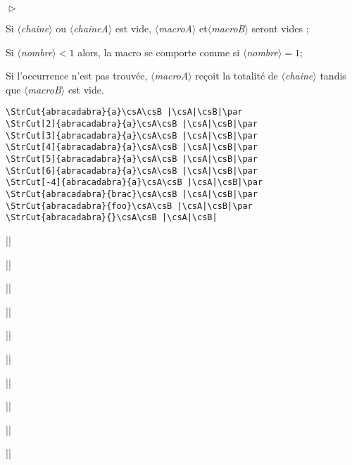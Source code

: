 \documentclass[a4paper,10pt]{article}
\newcommand\argu[1]{$\langle$\textit{#1}$\rangle$}
\newenvironment{Conditions}[1][1cm]%
{\begin{list}%
	{$\vartriangleright$}%
	{\setlength{\leftmargin}{#1}
	 \setlength{\itemsep}{0pt}
	 \setlength{\parsep}{0pt}
	 \setlength{\topsep}{2ptplus3ptminus2pt}
	}}%
{\end{list}}
\newcommand\styleexemple{\small\vskip4pt}
\begin{document}
\begin{Conditions}
	\item Si \argu{chaine} ou \argu{chaineA} est vide, \argu{macroA} et\argu{macroB} seront vides ;
	\item Si \argu{nombre}${}<1$ alors, la macro se comporte comme si \argu{nombre}${}=1$;
	\item Si l'occurrence n'est pas trouvée, \argu{macroA} reçoit la totalité de \argu{chaine} tandis que \argu{macroB} est vide.
\end{Conditions}
\begin{minipage}[t]{0.65\linewidth}
\begin{lstlisting}
\StrCut{abracadabra}{a}\csA\csB |\csA|\csB|\par
\StrCut[2]{abracadabra}{a}\csA\csB |\csA|\csB|\par
\StrCut[3]{abracadabra}{a}\csA\csB |\csA|\csB|\par
\StrCut[4]{abracadabra}{a}\csA\csB |\csA|\csB|\par
\StrCut[5]{abracadabra}{a}\csA\csB |\csA|\csB|\par
\StrCut[6]{abracadabra}{a}\csA\csB |\csA|\csB|\par
\StrCut[-4]{abracadabra}{a}\csA\csB |\csA|\csB|\par
\StrCut{abracadabra}{brac}\csA\csB |\csA|\csB|\par
\StrCut{abracadabra}{foo}\csA\csB |\csA|\csB|\par
\StrCut{abracadabra}{}\csA\csB |\csA|\csB|
\end{lstlisting}%
\end{minipage}\hfill
\begin{minipage}[t]{0.35\linewidth}
	\def\seprouge{{\color{red}|}}
	\styleexemple
	\csA\csB |\csA\seprouge\csB|\par
	\csA\csB |\csA\seprouge\csB|\par
	\csA\csB |\csA\seprouge\csB|\par
	\csA\csB |\csA\seprouge\csB|\par
	\csA\csB |\csA\seprouge\csB|\par
	\csA\csB |\csA\seprouge\csB|\par
	\csA\csB |\csA\seprouge\csB|\par
	\csA\csB |\csA\seprouge\csB|\par
	\csA\csB |\csA\seprouge\csB|\par
	\csA\csB |\csA\seprouge\csB|
\end{minipage}%
\end{document}
